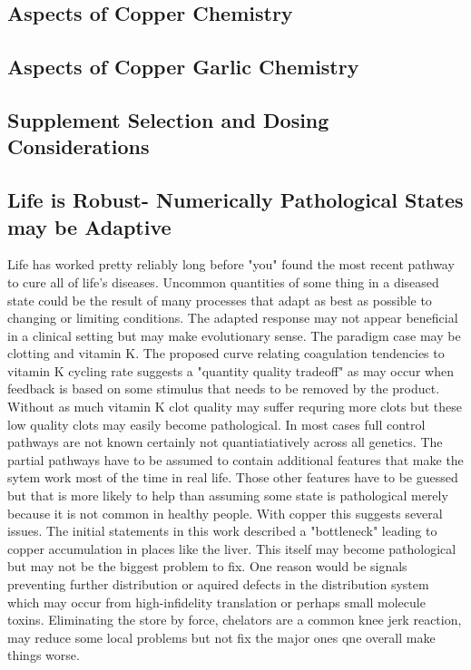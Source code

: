 



\subsection{Aspects of Copper Chemistry  }

\subsection{Aspects of Copper Garlic  Chemistry  }


\subsection{Supplement Selection and Dosing Considerations  }


\subsection{Life is Robust- Numerically Pathological States may be Adaptive }
Life has worked pretty reliably long before "you" found the
most recent pathway to cure all of life's diseases.
Uncommon quantities of some thing in a diseased state could be the
result of many processes that adapt as best as possible to changing
or limiting conditions. The adapted response may not appear beneficial
in a clinical setting but may make evolutionary sense. 
The paradigm case may be clotting and vitamin K. The proposed
curve relating coagulation tendencies to vitamin K cycling rate
suggests a "quantity quality tradeoff" as may occur when feedback
is based on some stimulus that needs to be removed by the product.
Without as much vitamin K clot quality may suffer requring 
more clots but these low quality clots may easily become pathological.
In most cases full control pathways are not known certainly
not quantiatiatively across all genetics. The partial pathways
have to be assumed to contain additional features
that make the sytem work most of the time in real life.
Those other features have to be guessed but that is more likely
to help than assuming some state is pathological merely
because it is not common in healthy people.
With copper this suggests several issues. The initial statements
in this work described a "bottleneck" leading
to copper accumulation in places like the liver. This itself
may become pathological but may not be the biggest problem
to fix. One reason would be signals preventing further distribution
or aquired defects in the distribution system which may occur 
from high-infidelity translation or perhaps small molecule toxins.  
Eliminating the store by force, chelators are a common knee
jerk reaction,  may reduce some local problems but not fix the
major ones qne overall make things worse. 


